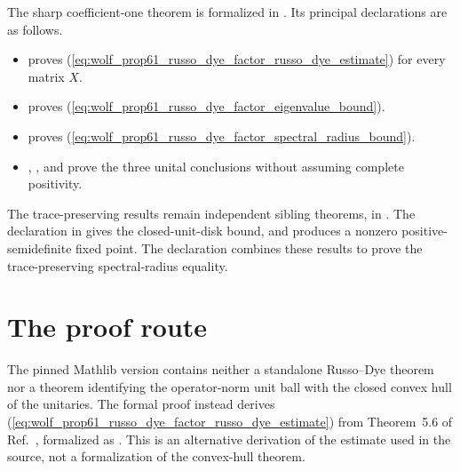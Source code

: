 \documentclass{article}
\begin{document}
The sharp coefficient-one theorem is formalized in
. Its principal
declarations are as follows.
\begin{itemize}
    \item
    proves
    (\ref{eq:wolf_prop61_russo_dye_factor_russo_dye_estimate}) for every
    matrix $X$.

    \item
    proves
    (\ref{eq:wolf_prop61_russo_dye_factor_eigenvalue_bound}).

    \item
    proves
    (\ref{eq:wolf_prop61_russo_dye_factor_spectral_radius_bound}).

    \item
    ,
    ,
    and
    prove the three unital conclusions without assuming complete positivity.
\end{itemize}

The trace-preserving results remain independent sibling theorems, in
. The
declaration
 in
 gives the closed-unit-disk bound,
and
 produces
a nonzero positive-semidefinite fixed point. The declaration
 combines
these results to prove the trace-preserving spectral-radius equality.

\section{The proof route}

The pinned Mathlib version contains neither a standalone Russo--Dye theorem
nor a theorem identifying the operator-norm unit ball with the closed convex
hull of the unitaries. The formal proof instead derives
(\ref{eq:wolf_prop61_russo_dye_factor_russo_dye_estimate}) from
Theorem~5.6 of Ref.~\cite{Wolf2012Quantum}, formalized as
.
This is an alternative derivation of the estimate used in the source, not a
formalization of the convex-hull theorem.
\end{document}
